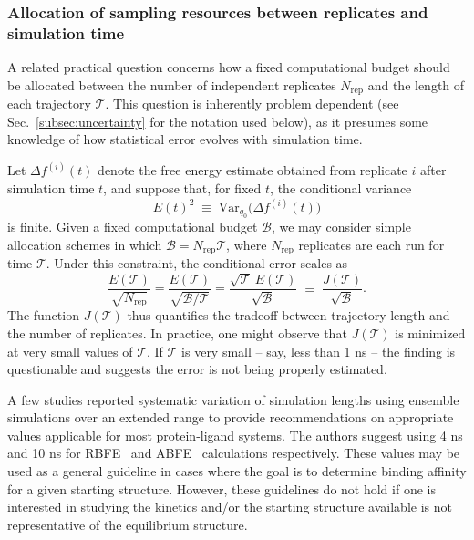 \subsubsection{Allocation of sampling resources between replicates and simulation time}

A related practical question concerns how a fixed computational budget should be allocated between the number of independent replicates $N_{\mathrm{rep}}$ and the length of each trajectory $\mathcal{T}$. This question is inherently problem dependent (see Sec.~\ref{subsec:uncertainty} for the notation used below), as it presumes some knowledge of how statistical error evolves with simulation time. 

Let $\Delta f^{(i)}(t)$ denote the free energy estimate obtained from replicate $i$ after simulation time $t$, and suppose that, for fixed $t$, the conditional variance 
\[
E(t)^2 \;\equiv\; \mathrm{Var}_{q_0}\!\bigl(\Delta f^{(i)}(t)\bigr)
\]
is finite. Given a fixed computational budget $\mathcal{B}$, we may consider simple allocation schemes in which $\mathcal{B} = N_{\mathrm{rep}}\mathcal{T}$, where $N_{\mathrm{rep}}$ replicates are each run for time $\mathcal{T}$. Under this constraint, the conditional error scales as
\[
\frac{E(\mathcal{T})}{\sqrt{N_{\mathrm{rep}}}}
= \frac{E(\mathcal{T})}{\sqrt{\mathcal{B}/\mathcal{T}}}
= \frac{\sqrt{\mathcal{T}}\,E(\mathcal{T})}{\sqrt{\mathcal{B}}}
\;\equiv\; \frac{J(\mathcal{T})}{\sqrt{\mathcal{B}}}.
\]
The function $J(\mathcal{T})$ thus quantifies the tradeoff between trajectory length and the number of replicates. In practice, one might observe that $J(\mathcal{T})$ is minimized at very small values of $\mathcal{T}$. If $\mathcal{T}$ is very small -- say, less than 1 ns -- the finding is questionable and suggests the error is not being properly estimated. 

A few studies reported systematic variation of simulation lengths using ensemble simulations over an extended range to provide recommendations on appropriate values applicable for most protein-ligand systems. The authors suggest using 4 ns and 10 ns for RBFE~\cite{bhati2017, bhati2022, wan2023eqvsneq} and ABFE~\cite{bhati2025} calculations respectively. These values may be used as a general guideline in cases where the goal is to determine binding affinity for a given starting structure. However, these guidelines do not hold if one is interested in studying the kinetics and/or the starting structure available is not representative of the equilibrium structure.

